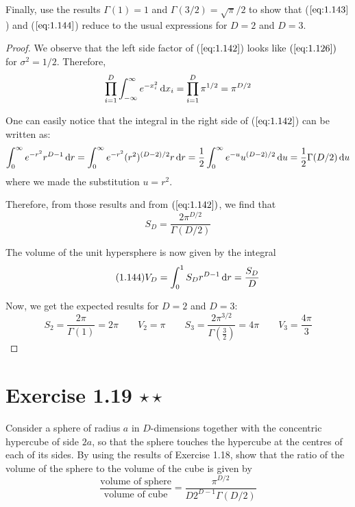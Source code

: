 Finally, use the results $\Gamma(1) = 1$ and $\Gamma(3/2) = \sqrt{\pi}/2$ to show
that ($\ref{eq:1.143}$) and ($\ref{eq:1.144}$) reduce to the usual
expressions for $D = 2$ and $D = 3$.

\vspace{1em}

\begin{proof}
    We observe that the left side factor of ($\ref{eq:1.142}$) looks like 
    $(\ref{eq:1.126})$ for $\sigma^2 = 1/2$. Therefore,
    \[
        \prod_{i = 1}^D \int_{-\infty}^{\infty} e^{-x_i^2} \mathop{}\!\mathrm{d} x_i
        = \prod_{i = 1}^D \pi^{1/2} 
        = \pi^{D/2}
    \] 

    One can easily notice that the integral in the right side of ($\ref{eq:1.142}$)
    can be written as:
     \[
         \int_{0}^{\infty} e^{-r^2}r^{D - 1} \mathop{}\!\mathrm{d} r
         = \int_{0}^{\infty} e^{-r^2} (r^2)^{(D - 2) / 2} r \mathop{}\!\mathrm{d} r
         = \frac{1}{2}\int_{0}^{\infty} e^{-u} u^{(D - 2)/2} \mathop{}\!\mathrm{d} u
         = \frac{1}{2} \Gamma(D/2) \mathop{}\!\mathrm{d} u
    \] 
    where we made the substitution $u = r^2$.

    Therefore, from those results and from $(\ref{eq:1.142})$, we find that
    \begin{equation*}\tag{1.143}
        S_D =\frac{2\pi^{D/2}}{\Gamma(D/2)}
    \end{equation*}

    The volume of the unit hypersphere is now given by the integral
    \begin{equation*}\tag{1.144}
        V_D = \int_{0}^{1} S_D r^{D - 1} \mathop{}\!\mathrm{d} r = \frac{S_D}{D}
    \end{equation*}

    Now, we get the expected results for $D = 2$ and $D = 3$:
    \[
        S_2 = \frac{2\pi}{\Gamma(1)} = 2\pi 
        \hspace{2em}
        V_2 = \pi
        \hspace{2em}
        S_3 = \frac{2\pi^{3/2}}{\Gamma(\frac{3}{2})} = 4\pi
        \hspace{2em}
        V_3 = \frac{4\pi}{3}
    \] 
\end{proof}

\section*{Exercise 1.19 $\star \star$}
Consider a sphere of radius $a$ in $D$-dimensions together with
the concentric hypercube of side $2a$, so that the sphere touches
the hypercube at the centres of each of its sides. By using the results
of Exercise 1.18, show that the ratio of the volume of the sphere
to the volume of the cube is given by
\begin{equation*}
    \frac{\text{volume of sphere}}{\text{volume of cube}} 
    = \frac{\pi^{D/2}}{D2^{D - 1}\Gamma(D/2)}
    \tag{1.145}\label{eq:1.145}
\end{equation*}

